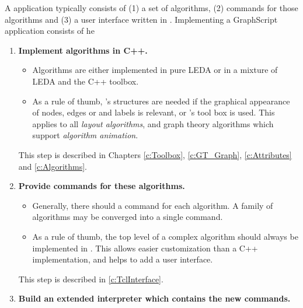 \documentclass[twoside,fleqn]{report}
\begin{document}
A \Graphlet{} application typically consists of (1) a set of
algorithms, (2) \GraphScript{} commands for those algorithms and
(3) a user interface written in \GraphScript{}. Implementing a
GraphScript application consists of he

\begin{enumerate}
  
  \item \textbf{Implement algorithms in C++.}

  \begin{itemize}

    \item
    Algorithms are either implemented in pure LEDA or in a mixture of LEDA 
    and the \Graphlet{} C++ toolbox.
    
    \item As a rule of thumb, \Graphlet{}'s structures are needed
    if the graphical appearance of nodes, edges or and labels is
    relevant, or \Graphlet{}'s tool box is used.  This applies to
    all \emph{layout algorithms}, and graph theory algorithms
    which support \emph{algorithm animation}.

  \end{itemize}

  This step is described in Chapters \ref{c:Toolbox}, 
  \ref{c:GT_Graph}, \ref{c:Attributes} and 
  \ref{c:Algorithms}.


  \item \textbf{Provide \GraphScript{} commands for these
      algorithms.}

  \begin{itemize}
    
    \item Generally, there should a \GraphScript{} command for
    each algorithm. A family of algorithms may be converged into
    a single command.

    \item As a rule of thumb, the top level of a complex
    algorithm should always be implemented in \GraphScript{}.
    This allows easier customization than a C++ implementation,
    and helps to add a user interface.

  \end{itemize}

  This step is described in \ref{c:TclInterface}.
  
  
  \item \textbf{Build an extended \GraphScript{} interpreter
      which contains the new commands.}


\end{enumerate}
\end{document}
